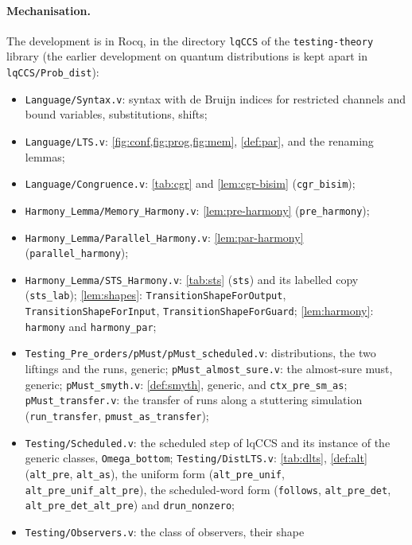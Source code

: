 \paragraph{Mechanisation.} The development is in Rocq, in the directory
\texttt{lqCCS} of the \texttt{testing-theory} library (the earlier
development on quantum distributions is kept apart in \texttt{lqCCS/Prob\_dist}):
\begin{itemize}
\item \texttt{Language/Syntax.v}: syntax with de Bruijn indices for restricted
  channels and bound variables, substitutions, shifts;
\item \texttt{Language/LTS.v}: \cref{fig:conf,fig:prog,fig:mem},
  \cref{def:par}, and the renaming lemmas;
\item \texttt{Language/Congruence.v}: \cref{tab:cgr} and
  \cref{lem:cgr-bisim} (\texttt{cgr\_bisim});
\item \texttt{Harmony\_Lemma/Memory\_Harmony.v}: \cref{lem:pre-harmony}
  (\texttt{pre\_harmony});
\item \texttt{Harmony\_Lemma/Parallel\_Harmony.v}: \cref{lem:par-harmony}
  (\texttt{parallel\_harmony});
\item \texttt{Harmony\_Lemma/STS\_Harmony.v}: \cref{tab:sts} (\texttt{sts}) and its
  labelled copy (\texttt{sts\_lab}); \cref{lem:shapes}: \newline
  \texttt{TransitionShapeForOutput}, \texttt{TransitionShapeForInput}, \newline
  \texttt{TransitionShapeForGuard};
  \cref{lem:harmony}: \texttt{harmony} and \texttt{harmony\_par};
\iffalse
\item \texttt{Testing\_Pre\_orders/pMust/pMust\_scheduled.v}: distributions,
  the two liftings and the runs, generic; \texttt{pMust\_almost\_sure.v}:
  the almost-sure must, generic; \texttt{pMust\_smyth.v}:
  \cref{def:smyth}, generic, and \texttt{ctx\_pre\_sm\_as};
  \texttt{pMust\_transfer.v}: the transfer of runs along a stuttering
  simulation (\texttt{run\_transfer}, \texttt{pmust\_as\_transfer});
\item \texttt{Testing/Scheduled.v}: the scheduled step of lqCCS and its instance of the
  generic classes, \texttt{Omega\_bottom}; \texttt{Testing/DistLTS.v}: \cref{tab:dlts}, \cref{def:alt}
  (\texttt{alt\_pre}, \texttt{alt\_as}), the uniform form (\texttt{alt\_pre\_unif},
  \texttt{alt\_pre\_unif\_alt\_pre}), the scheduled-word form (\texttt{follows},
  \texttt{alt\_pre\_det}, \texttt{alt\_pre\_det\_alt\_pre}) and \texttt{drun\_nonzero};
\item \texttt{Testing/Observers.v}: the class of observers, their shape

\end{itemize}
